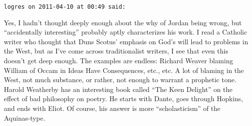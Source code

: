 \begin{footnotesize}
\begin{sffamily}
\hfill

\texttt{logres on 2011-04-10 at 00:49 said:}

Yes, I hadn't thought deeply enough about the why of Jordan being wrong, but ``accidentally interesting'' probably aptly characterizes his work. I read a Catholic writer who thought that Duns Scotus' emphasis on God's will lead to problems in the West, but as I've come across traditionalist writers, I see that even this doesn't get deep enough. The examples are endless: Richard Weaver blaming William of Occam in Ideas Have Consequences, etc., etc. A lot of blaming in the West, not much substance, or rather, not enough to warrant a prophetic tone. Harold Weatherby has an interesting book called ``The Keen Delight'' on the effect of bad philosophy on poetry. He starts with Dante, goes through Hopkins, and ends with Eliot. Of course, his answer is more ``scholasticism'' of the Aquinas-type.

\hfill

\end{sffamily}
\end{footnotesize}

